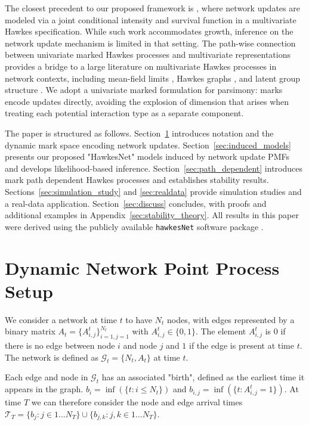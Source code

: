\documentclass[12pt]{article}
\begin{document}
The closest precedent to our proposed framework is \citep{farajtabar2017coevolve}, where network updates are modeled via a joint conditional intensity and survival function in a multivariate Hawkes specification. While such work accommodates growth, inference on the network update mechanism is limited in that setting. The path-wise connection between univariate marked Hawkes processes and multivariate representations \citep{davis2024multivariate} provides a bridge to a large literature on multivariate Hawkes processes in network contexts, including mean-field limits \citep{delattre2016hawkes}, Hawkes graphs \citep{embrechts2018hawkes}, and latent group structure \citep{fang2024group}. We adopt a univariate marked formulation for parsimony: marks encode updates directly, avoiding the explosion of dimension that arises when treating each potential interaction type as a separate component.

The paper is structured as follows. Section~\ref{sec:prelim} introduces notation and the dynamic mark space encoding network updates. Section~\ref{sec:induced_models} presents our proposed "HawkesNet" models induced by network update PMFs and develops likelihood-based inference. Section~\ref{sec:path_dependent} introduces mark path dependent Hawkes processes and establishes stability results. Sections~\ref{sec:simulation_study} and \ref{sec:realdata} provide simulation studies and a real-data application. Section~\ref{sec:discuss} concludes, with proofs and additional examples in Appendix~\ref{sec:stability_theory}. All results in this paper were derived using the publicly available \texttt{hawkesNet} software package \cite{hawkesNest}.

\section{Dynamic Network Point Process Setup}\label{sec:prelim}


We consider a network at time $t$ to have  $N_t$ nodes, with edges represented by a binary matrix $A_t = \lbrace A_{i,j}^t \rbrace_{i=1,j=1}^{N_t}$ with $A^{t}_{i,j} \in \lbrace 0,1\rbrace$. The element $A_{i,j}^t$ is 0 if there is no edge between node $i$ and node $j$ and $1$ if the edge is present at time $t$. The network is defined as $\mathcal{G}_t = \lbrace N_t,A_{t} \rbrace $ at time $t$.


 Each edge and node in $\mathcal{G}_t$ has an associated "birth", defined as the earliest time it appears in the graph. $b_i = \inf(\lbrace t : i \leq N_t\rbrace)$ and $b_{i,j} = \inf(\lbrace t : A_{i,j}^{t} = 1\rbrace )$. At time $T$ we can therefore consider the node and edge arrival times $\mathcal{T}_{T} = \lbrace b_{j} : j\in {1\ldots N_T} \rbrace \cup \lbrace b_{j,k} : j,k \in {1\ldots N_T}  \rbrace$.
\end{document}

